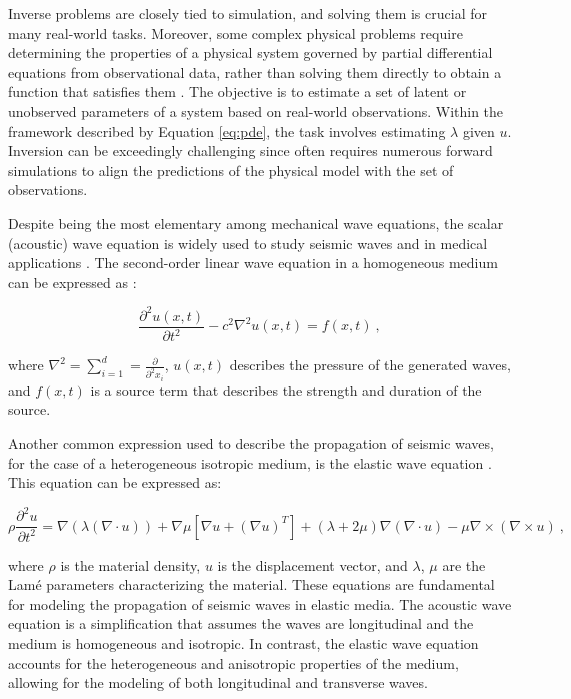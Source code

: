 \documentclass[11pt,twoside]{article}
\begin{document}
Inverse problems are closely tied to simulation, and solving them is crucial for many real-world tasks. Moreover, some complex 
physical problems require determining the properties of a physical system governed by partial differential equations from 
observational data, rather than solving them directly to obtain a function that satisfies them 
\citep{galiounas_battery_2022, ren_seismicnet_2024,mccann_convolutional_2017}. The objective is to estimate a set of latent or 
unobserved parameters of a system based on real-world observations. Within the framework described by Equation \ref{eq:pde}, 
the task involves estimating $\lambda$ given $u$. Inversion can be exceedingly challenging since often requires numerous forward 
simulations to align the predictions of the physical model with the set of observations. 

Despite being the most elementary among mechanical wave equations, the scalar (acoustic) wave equation is widely used to study 
seismic waves and in medical applications \citep{moseley_physics-informed_2022, alkhadhr_wave_2023}. The second-order linear 
wave equation in a homogeneous medium can be expressed as \citep{Carcione2002}:

\begin{equation*}
\frac{\partial^2 u(x, t)}{\partial t^2} - c^{2} \nabla^2 u(x, t) = f(x, t) \ ,
\label{acoustic}
\end{equation*}

where $\nabla^2 = \sum_{i=1}^{d} = \frac{\partial}{\partial^{2} x_{i}}$, \( u(x, t) \) describes the pressure of 
the generated waves, and \( f(x, t) \) is a source term that describes the strength and duration of the source.

Another common expression used to describe the propagation of seismic waves, for the case of a heterogeneous 
isotropic medium, is the elastic wave equation \citep{moseley_fast_2018, lehmann_fourier_2023}. This equation can 
be expressed as:

\begin{equation*}
\rho \frac{\partial^2 u}{\partial t^2} = \nabla (\lambda (\nabla \cdot u)) + \nabla \mu \left[\nabla u 
+ (\nabla u)^T\right] + (\lambda + 2\mu) \nabla (\nabla \cdot u) - \mu \nabla \times (\nabla \times u) \ ,
\label{elastic}
\end{equation*}

where $\rho$ is the material density, $u$ is the displacement vector, and $\lambda$, $\mu$ are the Lamé parameters 
characterizing the material. These equations are fundamental for modeling the propagation of seismic waves in 
elastic media. The acoustic wave equation is a simplification that assumes the waves are longitudinal and the 
medium is homogeneous and isotropic. In contrast, the elastic wave equation accounts for the heterogeneous 
and anisotropic properties of the medium, allowing for the modeling of both longitudinal and transverse waves.
\end{document}
